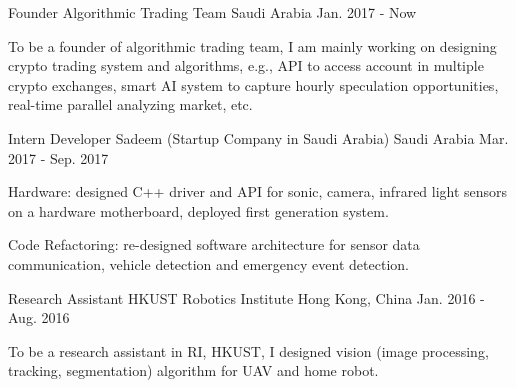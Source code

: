 

\begin{cventries}

  \cventry
    {Founder} %
    {Algorithmic Trading Team} %
    {Saudi Arabia} %
    {Jan. 2017 - Now} %
    {
      \begin{cvitems} %
        \item {To be a founder of algorithmic trading team, I am mainly working on designing crypto trading system and algorithms, e.g., API to access account in multiple crypto exchanges, smart AI system to capture hourly speculation opportunities, real-time parallel analyzing market, etc. }
      \end{cvitems}
    }

  \cventry
    {Intern Developer} %
    {Sadeem (Startup Company in Saudi Arabia)} %
    {Saudi Arabia} %
    {Mar. 2017 - Sep. 2017} %
    {
      \begin{cvitems} %
        \item {Hardware: designed C++ driver and API for sonic, camera, infrared light sensors on a hardware motherboard, deployed first generation system.}
        \item {Code Refactoring: re-designed software architecture for sensor data communication, vehicle detection and emergency event detection.}
      \end{cvitems}
    }

  \cventry
    {Research Assistant} %
    {HKUST Robotics Institute} %
    {Hong Kong, China} %
    {Jan. 2016 - Aug. 2016} %
    {
      \begin{cvitems} %
        \item {To be a research assistant in RI, HKUST, I designed vision (image processing, tracking, segmentation) algorithm for UAV and home robot.}
      \end{cvitems}
    }


\end{cventries}
